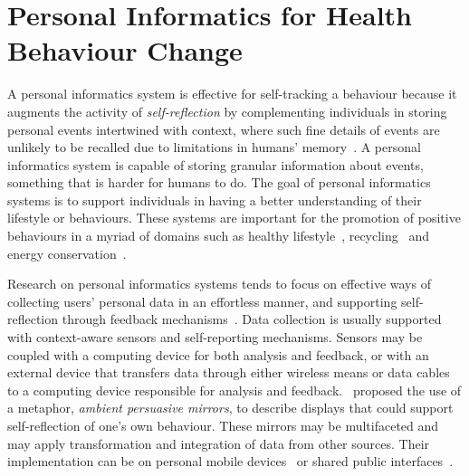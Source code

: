 \section{Personal Informatics for Health Behaviour Change}
A personal informatics system is effective for self-tracking a behaviour because it augments the activity of \emph{self-reflection} by complementing individuals in storing personal events intertwined with context, where such fine details of events are unlikely to be recalled due to limitations in humans' memory~\citep{li2010stage}. A personal informatics system is capable of storing granular information about events, something that is harder for humans to do. The goal of personal informatics systems is to support individuals in having a better understanding of their lifestyle or behaviours. These systems are important for the promotion of positive behaviours in a myriad of domains such as healthy lifestyle~\citep{korhonen2010personal}, recycling~\citep{comber2013designing} and energy conservation~\citep{seligman1977feedback}. 

Research on personal informatics systems tends to focus on effective ways of collecting users' personal data in an effortless manner, and supporting self-reflection through feedback mechanisms~\citep{li2011understanding}. Data collection is usually supported with context-aware sensors and self-reporting mechanisms. Sensors may be coupled with a computing device for both analysis and feedback, or with an external device that transfers data through either wireless means or data cables to a computing device responsible for analysis and feedback.~\cite{nakajima2013designing} proposed the use of a metaphor, \emph{ambient persuasive mirrors}, to describe displays that could support self-reflection of one's own behaviour. These mirrors may be multifaceted and may apply transformation and integration of data from other sources. Their implementation can be on personal mobile devices~\citep{klasnja2009:using} or shared public interfaces~\citep{lin2006:fish}.

